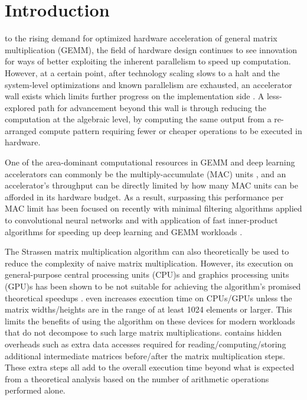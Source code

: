 \section{Introduction}
\copyrightnotice
{} to the rising demand for optimized hardware acceleration of general matrix multiplication (GEMM), the field of hardware design continues to see innovation for ways of better exploiting the inherent parallelism to speed up computation.
However, at a certain point, after technology scaling slows to a halt and the system-level optimizations and known parallelism are exhausted, an accelerator wall exists which limits further progress on the implementation side \cite{fuchs2019accelator}.
A less-explored path for advancement beyond this wall is through reducing the computation at the algebraic level, by computing the same output from a re-arranged compute pattern requiring fewer or cheaper operations to be executed in hardware.

One of the area-dominant computational resources in GEMM and deep learning accelerators can commonly be the multiply-accumulate (MAC) units \multDominant, and an accelerator's throughput can be directly limited by how many MAC units can be afforded in its hardware budget.
As a result, surpassing this performance per MAC limit has been focused on recently with minimal filtering algorithms applied to convolutional neural networks \winoConv and with application of fast inner-product algorithms for speeding up deep learning and GEMM workloads \cite{pogue2024fast}.

The Strassen matrix multiplication algorithm \cite{strassen1969gaussian} can also theoretically be used to reduce the complexity of naive matrix multiplication.
However, its execution on general-purpose central processing units (CPU)s and graphics processing units (GPU)s has been shown to be not suitable for achieving the algorithm's promised theoretical speedups \citeCpu.
\sa even increases execution time on CPUs/GPUs unless the matrix widths/heights are in the range of at least 1024 elements or larger.
This limits the benefits of using the algorithm on these devices for modern workloads that do not decompose to such large matrix multiplications.
\sa contains hidden overheads such as extra data accesses required for reading/computing/storing additional intermediate matrices before/after the matrix multiplication steps.
These extra steps all add to the overall execution time beyond what is expected from a theoretical analysis based on the number of arithmetic operations performed alone.


